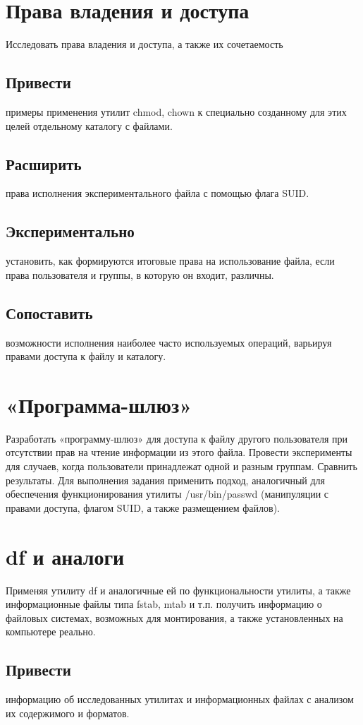 \documentclass[a4paper]{article}
\begin{document}
\section{Права владения и доступа} Исследовать права владения и доступа, а также их сочетаемость
\subsection{ Привести} примеры применения утилит chmod, chown к специально созданному для этих целей отдельному каталогу с файлами. 
\subsection{ Расширить} права исполнения экспериментального файла с помощью флага SUID. 
\subsection{ Экспериментально} установить, как формируются итоговые права на использование файла, если права пользователя и группы, в которую он входит, различны.
\subsection{ Сопоставить} возможности исполнения наиболее часто используемых операций, варьируя правами доступа к файлу и каталогу.

\section{«Программа-шлюз» } Разработать «программу-шлюз» для доступа к файлу другого пользователя при отсутствии прав на чтение информации из этого файла. Провести эксперименты для случаев, когда пользователи принадлежат одной и разным группам. Сравнить результаты. Для выполнения задания применить подход, аналогичный для обеспечения функционирования утилиты /usr/bin/passwd (манипуляции с правами доступа, флагом SUID, а также размещением файлов).

\section{ df и аналоги} Применяя утилиту df и аналогичные ей по функциональности утилиты, а также информационные файлы типа fstab, mtab и т.п. получить информацию о файловых системах, возможных для монтирования, а также установленных на компьютере реально. 
\subsection{ Привести} информацию об исследованных утилитах и информационных файлах с анализом их содержимого и форматов. 
\end{document}

